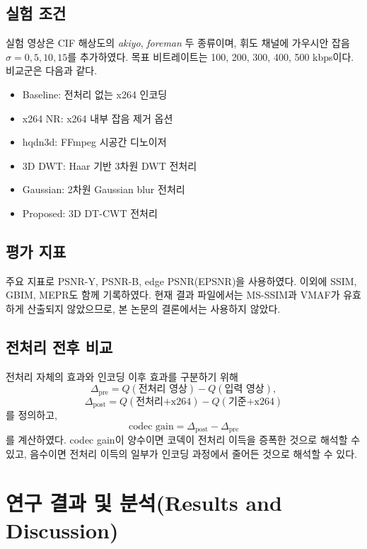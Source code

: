 \documentclass[10pt]{article}
\begin{document}
\subsection{실험 조건}
실험 영상은 CIF 해상도의 \textit{akiyo}, \textit{foreman} 두 종류이며, 휘도 채널에 가우시안 잡음 $\sigma=0,5,10,15$를 추가하였다. 목표 비트레이트는 100, 200, 300, 400, 500 kbps이다. 비교군은 다음과 같다.
\begin{itemize}
    \item Baseline: 전처리 없는 x264 인코딩
    \item x264 NR: x264 내부 잡음 제거 옵션
    \item hqdn3d: FFmpeg 시공간 디노이저
    \item 3D DWT: Haar 기반 3차원 DWT 전처리
    \item Gaussian: 2차원 Gaussian blur 전처리
    \item Proposed: 3D DT-CWT 전처리
\end{itemize}

\subsection{평가 지표}
주요 지표로 PSNR-Y, PSNR-B, edge PSNR(EPSNR)을 사용하였다. 이외에 SSIM, GBIM, MEPR도 함께 기록하였다. 현재 결과 파일에서는 MS-SSIM과 VMAF가 유효하게 산출되지 않았으므로, 본 논문의 결론에서는 사용하지 않았다.

\subsection{전처리 전후 비교}
전처리 자체의 효과와 인코딩 이후 효과를 구분하기 위해
\begin{equation}
\Delta_{\mathrm{pre}} = Q(\text{전처리 영상}) - Q(\text{입력 영상}),
\end{equation}
\begin{equation}
\Delta_{\mathrm{post}} = Q(\text{전처리+x264}) - Q(\text{기준+x264})
\end{equation}
를 정의하고,
\begin{equation}
\text{codec gain} = \Delta_{\mathrm{post}} - \Delta_{\mathrm{pre}}
\end{equation}
를 계산하였다. codec gain이 양수이면 코덱이 전처리 이득을 증폭한 것으로 해석할 수 있고, 음수이면 전처리 이득의 일부가 인코딩 과정에서 줄어든 것으로 해석할 수 있다.

\section{\large \bf 연구 결과 및 분석(Results and Discussion)}
\end{document}
